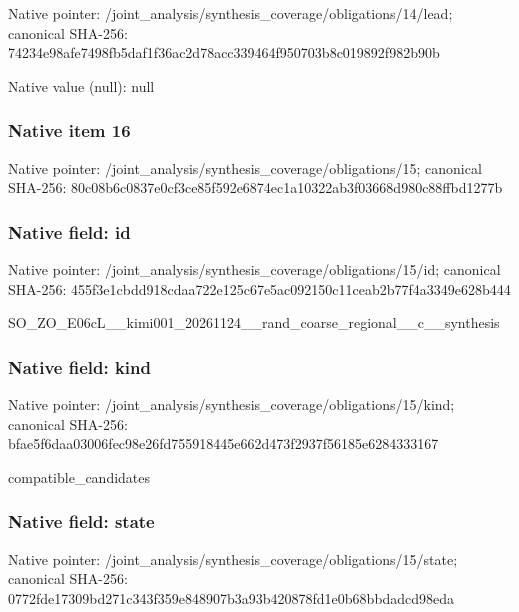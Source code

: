 \documentclass[10pt,a4paper]{article}
\begin{document}
Native pointer: /joint\_analysis/synthesi\allowbreak{}s\_coverage/obligations/1\allowbreak{}4/lead; canonical SHA-256: 74234e98afe7498fb5daf1f3\allowbreak{}6ac2d78acc339464f950703b\allowbreak{}8c019892f982b90b



Native value (null): null



\subsubsection{Native item 16}


Native pointer: /joint\_analysis/synthesi\allowbreak{}s\_coverage/obligations/1\allowbreak{}5; canonical SHA-256: 80c08b6c0837e0cf3ce85f59\allowbreak{}2e6874ec1a10322ab3f03668\allowbreak{}d980c88ffbd1277b



\subsubsection{Native field: id}


Native pointer: /joint\_analysis/synthesi\allowbreak{}s\_coverage/obligations/1\allowbreak{}5/id; canonical SHA-256: 455f3e1cbdd918cdaa722e12\allowbreak{}5c67e5ac092150c11ceab2b7\allowbreak{}7f4a3349e628b444


SO\_ZO\_E06cL\_\_kimi001\_202\allowbreak{}61124\_\_rand\_coarse\_regio\allowbreak{}nal\_\_c\_\_synthesis


\subsubsection{Native field: kind}


Native pointer: /joint\_analysis/synthesi\allowbreak{}s\_coverage/obligations/1\allowbreak{}5/kind; canonical SHA-256: bfae5f6daa03006fec98e26f\allowbreak{}d755918445e662d473f2937f\allowbreak{}56185e6284333167


compatible\_candidates


\subsubsection{Native field: state}


Native pointer: /joint\_analysis/synthesi\allowbreak{}s\_coverage/obligations/1\allowbreak{}5/state; canonical SHA-256: 0772fde17309bd271c343f35\allowbreak{}9e848907b3a93b420878fd1e\allowbreak{}0b68bbdadcd98eda
\end{document}
